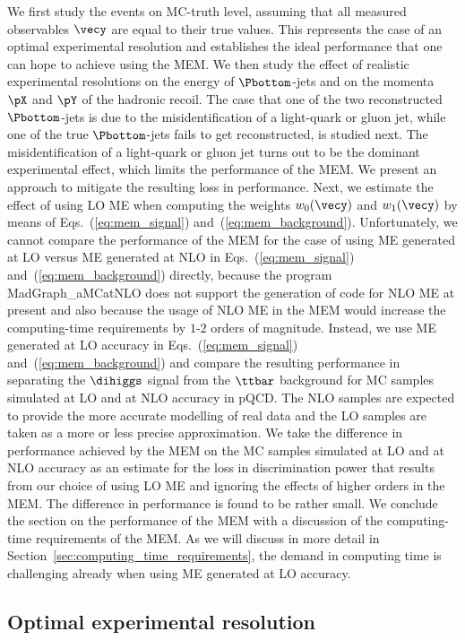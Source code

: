 We first study the events on MC-truth level, assuming that all measured observables $\vecy$ are equal to their true values.
This represents the case of an optimal experimental resolution and establishes the ideal performance that one can hope to achieve using the MEM.
We then study the effect of realistic experimental resolutions on the energy of $\Pbottom$-jets and on the momenta $\pX$ and $\pY$ of the hadronic recoil.
The case that one of the two reconstructed $\Pbottom$-jets is due to the misidentification of a light-quark or gluon jet,
while one of the true $\Pbottom$-jets fails to get reconstructed, is studied next.
The misidentification of a light-quark or gluon jet turns out to be the dominant experimental effect,
which limits the performance of the MEM.
We present an approach to mitigate the resulting loss in performance.
Next, we estimate the effect of using LO ME when computing the weights $w_{0}(\vecy)$ and $w_{1}(\vecy)$ 
by means of Eqs.~(\ref{eq:mem_signal}) and~(\ref{eq:mem_background}).
Unfortunately, we cannot compare the performance of the MEM
for the case of using ME generated at LO versus ME generated at NLO in Eqs.~(\ref{eq:mem_signal}) and~(\ref{eq:mem_background}) directly,
because the program MadGraph\_aMCatNLO does not support the generation of code for NLO ME at present
and also because the usage of NLO ME in the MEM would increase the computing-time requirements by $1$-$2$ orders of magnitude.
Instead, we use ME generated at LO accuracy in Eqs.~(\ref{eq:mem_signal}) and~(\ref{eq:mem_background}) 
and compare the resulting performance in separating the $\dihiggs$ signal from the $\ttbar$ background
for MC samples simulated at LO and at NLO accuracy in pQCD.
The NLO samples are expected to provide the more accurate modelling of real data and the LO samples are taken as a more or less precise approximation.
We take the difference in performance achieved by the MEM on the MC samples simulated at LO and at NLO accuracy
as an estimate for the loss in discrimination power that results from our choice of using LO ME and ignoring the effects of higher orders in the MEM.
The difference in performance is found to be rather small.
We conclude the section on the performance of the MEM with a discussion of the computing-time requirements of the MEM.
As we will discuss in more detail in Section~\ref{sec:computing_time_requirements}, the demand in computing time is challenging already when using ME generated at LO accuracy.


\subsection{Optimal experimental resolution}

